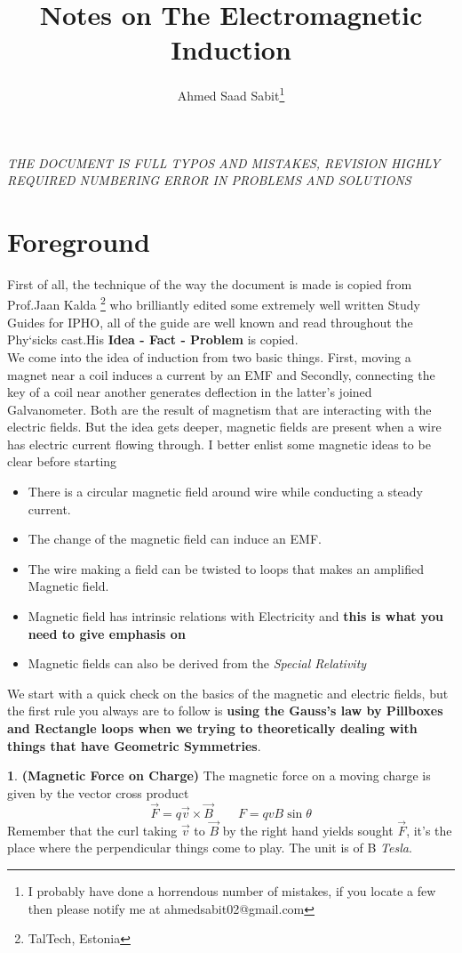 \documentclass[10pt,letterpaper,twocolumn]{article}
\author{Ahmed Saad Sabit\footnote{I probably have done a horrendous number of mistakes, if you locate a few then please notify me at ahmedsabit02@gmail.com}}
\title{\textsf{Notes on The Electromagnetic Induction}}
\theoremstyle{definition}
\newtheorem{fct}{\framebox[0.07\textwidth]{{\sffamily Fact}}}[section]
\theoremstyle{definition}
\theoremstyle{definition}
\begin{document}
\maketitle
\textit{THE DOCUMENT IS FULL TYPOS AND MISTAKES, REVISION HIGHLY REQUIRED	NUMBERING ERROR IN PROBLEMS AND SOLUTIONS}
\section{Foreground}
{\sffamily First of all, the technique of the way the document is made is copied from Prof.Jaan Kalda \footnote{TalTech, Estonia} who brilliantly edited some extremely well written Study Guides for IPHO, all of the guide are well known and read throughout the Phy`sicks cast.His \textbf{Idea - Fact - Problem} is copied.\\ We come into the idea of induction from two basic things. First, moving a magnet near a coil induces a current by an EMF and Secondly, connecting the key of a coil near another generates deflection in the latter's joined Galvanometer. Both are the result of magnetism that are interacting with the electric fields. But the idea gets deeper, magnetic fields are present when a wire has electric current flowing through. I better enlist some magnetic ideas to be clear before starting
\begin{itemize}
\item There is a circular magnetic field around wire while conducting a steady current.
\item The change of the magnetic field can induce an EMF. 
\item The wire making a field can be twisted to loops that makes an amplified Magnetic field.
\item Magnetic field has intrinsic relations with Electricity and \textbf{this is what you need to give emphasis on}
\item Magnetic fields can also be derived from the \emph{Special Relativity}
\end{itemize}
We start with a quick check on the basics of the magnetic and electric fields, but the first rule you always are to follow is \textbf{using the Gauss's law by Pillboxes and Rectangle loops when we trying to theoretically dealing with things that have Geometric Symmetries}.}
\begin{fct}\textbf{(Magnetic Force on Charge)}
 The magnetic force on a moving charge is given by the vector cross product
 \[\vec{F} = q\vec{v} \times \vec{B} \qquad F = qv B \sin \theta\]
 Remember that the curl taking $\vec{v}$ to $\vec{B}$ by the right hand yields sought $\vec{F}$, it's the place where the perpendicular things come to play. The unit is of B \emph{Tesla}.
 \end{fct}
\end{document}
